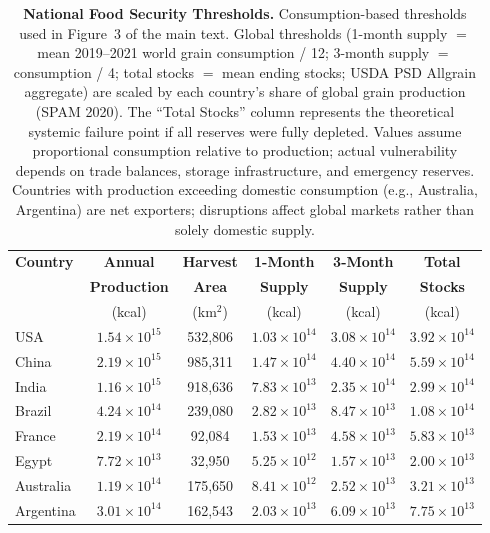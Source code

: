 \begin{table}[H]
    \centering
    \caption{\textbf{National Food Security Thresholds.} 
    Consumption-based thresholds used in Figure~3 of the main text. Global thresholds (1-month supply $=$ mean 2019--2021 world grain consumption / 12; 3-month supply $=$ consumption / 4; total stocks $=$ mean ending stocks; USDA PSD Allgrain aggregate) are scaled by each country's share of global grain production (SPAM 2020). The ``Total Stocks'' column represents the theoretical systemic failure point if all reserves were fully depleted. Values assume proportional consumption relative to production; actual vulnerability depends on trade balances, storage infrastructure, and emergency reserves. Countries with production exceeding domestic consumption (e.g., Australia, Argentina) are net exporters; disruptions affect global markets rather than solely domestic supply.}
    \label{tab:S1_country_stocks}
    \vspace{0.3cm}
    \begin{tabular}{lccccc}
        \toprule
        \textbf{Country} & \textbf{Annual} & \textbf{Harvest} & \textbf{1-Month} & \textbf{3-Month} & \textbf{Total} \\
         & \textbf{Production} & \textbf{Area} & \textbf{Supply} & \textbf{Supply} & \textbf{Stocks} \\
         & (kcal) & (km$^2$) & (kcal) & (kcal) & (kcal) \\
        \midrule
        USA & $1.54 \times 10^{15}$ & 532,806 & $1.03 \times 10^{14}$ & $3.08 \times 10^{14}$ & $3.92 \times 10^{14}$ \\
        China & $2.19 \times 10^{15}$ & 985,311 & $1.47 \times 10^{14}$ & $4.40 \times 10^{14}$ & $5.59 \times 10^{14}$ \\
        India & $1.16 \times 10^{15}$ & 918,636 & $7.83 \times 10^{13}$ & $2.35 \times 10^{14}$ & $2.99 \times 10^{14}$ \\
        Brazil & $4.24 \times 10^{14}$ & 239,080 & $2.82 \times 10^{13}$ & $8.47 \times 10^{13}$ & $1.08 \times 10^{14}$ \\
        France & $2.19 \times 10^{14}$ & 92,084 & $1.53 \times 10^{13}$ & $4.58 \times 10^{13}$ & $5.83 \times 10^{13}$ \\
        Egypt & $7.72 \times 10^{13}$ & 32,950 & $5.25 \times 10^{12}$ & $1.57 \times 10^{13}$ & $2.00 \times 10^{13}$ \\
        Australia & $1.19 \times 10^{14}$ & 175,650 & $8.41 \times 10^{12}$ & $2.52 \times 10^{13}$ & $3.21 \times 10^{13}$ \\
        Argentina & $3.01 \times 10^{14}$ & 162,543 & $2.03 \times 10^{13}$ & $6.09 \times 10^{13}$ & $7.75 \times 10^{13}$ \\
        \bottomrule
    \end{tabular}
\end{table}